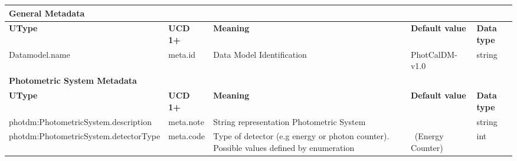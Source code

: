 \documentclass[11pt,a4paper]{ivoa}
\begin{document}
\begin{appendices}
\begin{table}[H]
 			\centering
 			\begin{adjustbox}{angle=90}
\begin{tabular}{p{2.5in}|p{1.5in}|p{2in}|p{0.74in}|p{0.35in}}
\multicolumn{5}{p{\dimexpr6.59in+8\tabcolsep\relax}}{\centering
{\fontsize{8pt}{8pt}\selectfont \textbf{General Metadata}}} \\
\hline
\multicolumn{1}{p{2.5in}}{{\fontsize{8pt}{8pt}\selectfont \textbf{UType}}} &
\multicolumn{1}{p{1.5in}}{{\fontsize{8pt}{8pt}\selectfont \textbf{UCD 1+}}} &
\multicolumn{1}{p{2in}}{{\fontsize{8pt}{8pt}\selectfont \textbf{Meaning}}} &
\multicolumn{1}{p{0.74in}}{{\fontsize{8pt}{8pt}\selectfont \textbf{Default value}}} &
\multicolumn{1}{p{0.35in}}{{\fontsize{8pt}{8pt}\selectfont \textbf{Data type}}} \\
\hline
\multicolumn{1}{p{2.5in}}{{\fontsize{8pt}{8pt}\selectfont Datamodel.name}} &
\multicolumn{1}{p{1.5in}}{{\fontsize{8pt}{8pt}\selectfont meta.id }} &
\multicolumn{1}{p{2in}}{{\fontsize{8pt}{8pt}\selectfont Data Model Identification }} &
\multicolumn{1}{p{0.74in}}{{\fontsize{8pt}{8pt}\selectfont PhotCalDM-v1.0}} &
\multicolumn{1}{p{0.35in}}{{\fontsize{8pt}{8pt}\selectfont string}} \\
\hline
\multicolumn{5}{p{\dimexpr6.59in+8\tabcolsep\relax}}{\centering
{\fontsize{8pt}{8pt}\selectfont \textbf{Photometric System Metadata}}} \\
\hline
\multicolumn{1}{p{2.5in}}{{\fontsize{8pt}{8pt}\selectfont \textbf{UType}}} &
\multicolumn{1}{p{1.5in}}{{\fontsize{8pt}{8pt}\selectfont \textbf{UCD 1+}}} &
\multicolumn{1}{p{2in}}{{\fontsize{8pt}{8pt}\selectfont \textbf{Meaning}}} &
\multicolumn{1}{p{0.74in}}{{\fontsize{8pt}{8pt}\selectfont \textbf{Default value}}} &
\multicolumn{1}{p{0.35in}}{{\fontsize{8pt}{8pt}\selectfont \textbf{Data type}}} \\
\hline
\multicolumn{1}{p{2.5in}}{{\fontsize{8pt}{8pt}\selectfont photdm:PhotometricSystem.description}} &
\multicolumn{1}{p{1.5in}}{{\fontsize{8pt}{8pt}\selectfont meta.note }} &
\multicolumn{1}{p{2in}}{{\fontsize{8pt}{8pt}\selectfont String representation Photometric System}} &
\multicolumn{1}{p{0.74in}}{} &
\multicolumn{1}{p{0.35in}}{{\fontsize{8pt}{8pt}\selectfont string}} \\
\hline
\multicolumn{1}{p{2.5in}}{{\fontsize{8pt}{8pt}\selectfont photdm:PhotometricSystem.detectorType}} &
\multicolumn{1}{p{1.5in}}{{\fontsize{8pt}{8pt}\selectfont meta.code }} &
\multicolumn{1}{p{2in}}{{\fontsize{8pt}{8pt}\selectfont Type of detector
(e.g energy or photon counter). Possible values defined by enumeration}} &
\multicolumn{1}{p{0.74in}}{{\fontsize{8pt}{8pt}\selectfont 0\  (Energy Counter)}} &
\multicolumn{1}{p{0.35in}}{{\fontsize{8pt}{8pt}\selectfont int}} \\
\hline
\end{tabular}
\end{adjustbox}
 \end{table}


\end{appendices}
\end{document}
